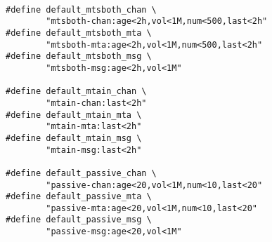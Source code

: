 \small\begin{verbatim}

#define default_mtsboth_chan \
        "mtsboth-chan:age<2h,vol<1M,num<500,last<2h"
#define default_mtsboth_mta \
        "mtsboth-mta:age<2h,vol<1M,num<500,last<2h"
#define default_mtsboth_msg \
        "mtsboth-msg:age<2h,vol<1M"

#define default_mtain_chan \
        "mtain-chan:last<2h"
#define default_mtain_mta \
        "mtain-mta:last<2h"
#define default_mtain_msg \
        "mtain-msg:last<2h"

#define default_passive_chan \
        "passive-chan:age<20,vol<1M,num<10,last<20"
#define default_passive_mta \
        "passive-mta:age<20,vol<1M,num<10,last<20"
#define default_passive_msg \
        "passive-msg:age<20,vol<1M"

\end{verbatim}
